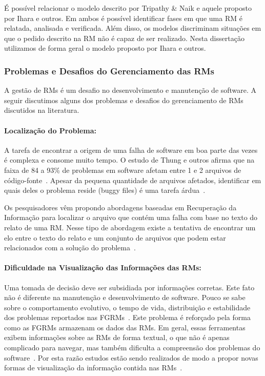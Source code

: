 É possível relacionar o modelo descrito por Tripathy \& Naik e aquele proposto
por Ihara e outros. Em ambos é possível identificar fases em que uma RM é
relatada, analisada e verificada. Além disso, os modelos discriminam situações
em que o pedido descrito na RM não é capaz de ser realizado. Nesta dissertação
utilizamos de forma geral o modelo proposto por Ihara e outros.

\subsubsection{Problemas e Desafios do Gerenciamento das RMs}\label{ssub:problemas_relacionadas_rm}

A gestão de RMs é um desafio no desenvolvimento e manutenção de software.  A
seguir discutimos alguns dos problemas e desafios do gerenciamento de RMs
discutidos na literatura.

\paragraph{Localização do Problema:}

A tarefa de encontrar a origem de uma falha de software em boa parte das vezes é
complexa e consome muito tempo. O estudo de Thung e outros afirma que na faixa
de 84 a 93\% de problemas em software afetam entre 1 e 2 arquivos de
código-fonte~\cite{thung2012faults}. Apesar da pequena quantidade de arquivos
afetados, identificar em quais deles o problema reside (buggy files) é uma
tarefa árdua~\cite{Thung:2014:BIT:2635868.2661678}.

Os pesquisadores vêm propondo abordagens baseadas em Recuperação da Informação
para localizar o arquivo que contém uma falha com base no texto do relato de uma
RM\@. Nesse tipo de abordagem existe a tentativa de encontrar um elo entre o
texto do relato e um conjunto de arquivos que podem estar relacionados com a
solução do problema~\cite{Wong:2014:BBF:2705615.2706096}.

\paragraph{Dificuldade na Visualização das Informações das RMs:}

Uma tomada de decisão deve ser subsidiada por informações corretas. Este fato
não é diferente na manutenção e desenvolvimento de software. Pouco se sabe sobre
o comportamento evolutivo, o tempo de vida, distribuição e estabilidade dos
problemas reportados nas FGRMs~\cite{hora2012bug}. Este problema é reforçado
pela forma como as FGRMs armazenam os dados das RMs. Em geral, essas ferramentas
exibem informações sobre as RMs de forma textual, o que não é apenas complicado
para navegar, mas também dificulta a compreensão dos problemas do
software~\cite{dal2014bug}. Por esta razão estudos estão sendo realizados de
modo a propor novas formas de visualização da informação contida nas
RMs~\cite{takama2013application,hora2012bug}.

